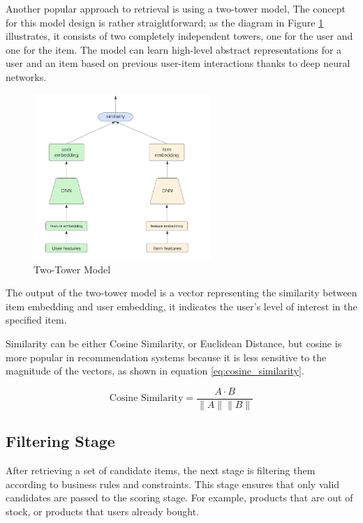 Another popular approach to retrieval is using a two-tower model, 
The concept for this model design is rather straightforward; as the diagram in Figure \ref{fig:TwoTowerModel} illustrates, it consists of two completely independent towers, 
one for the user and one for the item. 
The model can learn high-level abstract representations for a user and an item 
based on previous user-item interactions thanks to deep neural networks. 

\begin{figure}[H]
    \centering
    \includegraphics[width=0.6\textwidth]{assets/two_tower.jpeg}
    \caption[Two-Tower Model]{Two-Tower Model \cite{TwoTowerInRecSys}}
    \label{fig:TwoTowerModel}
\end{figure}

The output of the two-tower model is a vector representing the similarity between item embedding and user embedding, 
it indicates the user's level of interest in the specified item.

Similarity can be either Cosine Similarity, or Euclidean Distance, but cosine is more popular in recommendation systems because it is less sensitive to the magnitude of the vectors, as shown in equation \ref{eq:cosine_similarity}.

\begin{equation}
    \text{Cosine Similarity} = \frac{A \cdot B}{\|A\| \|B\|}
    \label{eq:cosine_similarity}
\end{equation}


\subsection{Filtering Stage}

After retrieving a set of candidate items, the next stage is filtering them according to business rules and constraints.
This stage ensures that only valid candidates are passed to the scoring stage.
For example, products that are out of stock, or products that users already bought.

